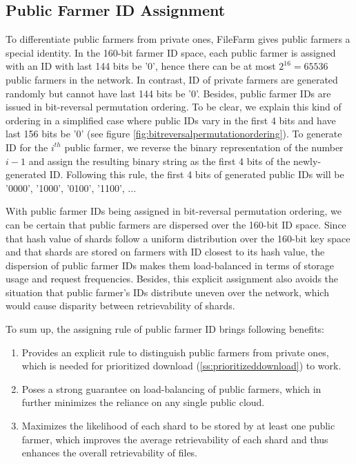 \subsection{Public Farmer ID Assignment}
\label{ss:publicfarmeridassignment}

To differentiate public farmers from private ones, FileFarm gives public farmers a special identity. In the 160-bit farmer ID space, each public farmer is assigned with an ID with last 144 bits be '0', hence there can be at most $2^{16}=65536$ public farmers in the network. In contrast, ID of private farmers are generated randomly but cannot have last 144 bits be '0'. Besides, public farmer IDs are issued in bit-reversal permutation ordering. To be clear, we explain this kind of ordering in a simplified case where public IDs vary in the first 4 bits and have last 156 bits be '0' (see figure \ref{fig:bitreversalpermutationordering}). To generate ID for the $i^{th}$ public farmer, we reverse the binary representation of the number $i-1$ and assign the resulting binary string as the first 4 bits of the newly-generated ID. Following this rule, the first 4 bits of generated public IDs will be '0000', '1000', '0100', '1100', ...

With public farmer IDs being assigned in bit-reversal permutation ordering, we can be certain that public farmers are dispersed over the 160-bit ID space. Since that hash value of shards follow a uniform distribution over the 160-bit key space and that shards are stored on farmers with ID closest to its hash value, the dispersion of public farmer IDs makes them load-balanced in terms of storage usage and request frequencies. Besides, this explicit assignment also avoids the situation that public farmer's IDs distribute uneven over the network, which would cause disparity between retrievability of shards.

To sum up, the assigning rule of public farmer ID brings following benefits:

\begin{enumerate}
  \item Provides an explicit rule to distinguish public farmers from private ones, which is needed for prioritized download (\ref{ss:prioritizeddownload}) to work.
  \item Poses a strong guarantee on load-balancing of public farmers, which in further minimizes the reliance on any single public cloud.
  \item Maximizes the likelihood of each shard to be stored by at least one public farmer, which improves the average retrievability of each shard and thus enhances the overall retrievability of files.
\end{enumerate}

